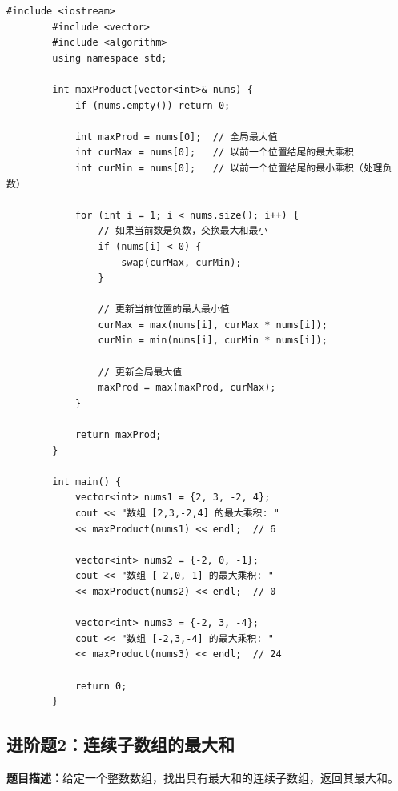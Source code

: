 \documentclass[12pt,a4paper]{article}
\begin{document}
	\begin{lstlisting}[caption={进阶题1：乘积最大子数组}]
		#include <iostream>
		#include <vector>
		#include <algorithm>
		using namespace std;
		
		int maxProduct(vector<int>& nums) {
			if (nums.empty()) return 0;
			
			int maxProd = nums[0];  // 全局最大值
			int curMax = nums[0];   // 以前一个位置结尾的最大乘积
			int curMin = nums[0];   // 以前一个位置结尾的最小乘积（处理负数）
			
			for (int i = 1; i < nums.size(); i++) {
				// 如果当前数是负数，交换最大和最小
				if (nums[i] < 0) {
					swap(curMax, curMin);
				}
				
				// 更新当前位置的最大最小值
				curMax = max(nums[i], curMax * nums[i]);
				curMin = min(nums[i], curMin * nums[i]);
				
				// 更新全局最大值
				maxProd = max(maxProd, curMax);
			}
			
			return maxProd;
		}
		
		int main() {
			vector<int> nums1 = {2, 3, -2, 4};
			cout << "数组 [2,3,-2,4] 的最大乘积: " 
			<< maxProduct(nums1) << endl;  // 6
			
			vector<int> nums2 = {-2, 0, -1};
			cout << "数组 [-2,0,-1] 的最大乘积: " 
			<< maxProduct(nums2) << endl;  // 0
			
			vector<int> nums3 = {-2, 3, -4};
			cout << "数组 [-2,3,-4] 的最大乘积: " 
			<< maxProduct(nums3) << endl;  // 24
			
			return 0;
		}
	\end{lstlisting}
	
	\subsection{进阶题2：连续子数组的最大和}
	
	\textbf{题目描述：}给定一个整数数组，找出具有最大和的连续子数组，返回其最大和。
	
\end{document}
